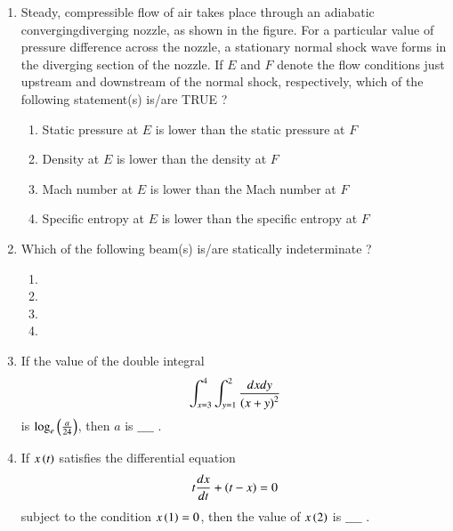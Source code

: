 \documentclass[journal]{IEEEtran}
\begin{document}
\begin{enumerate}
\item Steady, compressible flow of air takes place through an adiabatic convergingdiverging nozzle, as shown in the figure. For a particular value of pressure difference across the nozzle, a stationary normal shock wave forms in the diverging section of the nozzle. If $E$ and $F$ denote the flow conditions just upstream and downstream of the normal shock, respectively, which of the following statement(s) is/are TRUE ?
\begin{figure}[!ht]
\centering
\resizebox{0.7\textwidth}{!}{%

}%
\end{figure}
\begin{enumerate}
    \item Static pressure at $E$ is lower than the static pressure at $F$
    \item Density at $E$ is lower than the density at $F$
    \item Mach number at $E$ is lower than the Mach number at $F$
    \item Specific entropy at $E$ is lower than the specific entropy at $F$ \\
\end{enumerate}
\item Which of the following beam(s) is/are statically indeterminate ?
\begin{enumerate}
    \item \resizebox{0.4\textwidth}{!}{%

}%
\item \resizebox{0.45\textwidth}{!}{%

}%
\item \resizebox{0.4\textwidth}{!}{%

}%
\item \resizebox{0.4\textwidth}{!}{%

}%
\end{enumerate}
\item If the value of the double integral
\begin{align*}
    \int_{x=3}^{4}\int_{y=1}^{2} \frac{dxdy}{\left(x + y\right)^2}
\end{align*}
is $\log_e\left(\frac{a}{24}\right)$, then $a$ is $\_\_\_\_$ . \\
\item If $x\left(t\right)$ satisfies the differential equation
\begin{align*}
    t\frac{dx}{dt} + \left(t - x\right) = 0
\end{align*}
subject to the condition $x\left(1\right) = 0$, then the value of $x\left(2\right)$ is $\_\_\_\_$ . \\

\end{enumerate}
\end{document}
